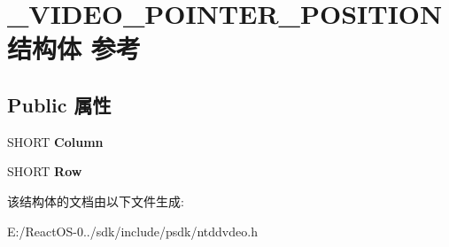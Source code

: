 \hypertarget{struct___v_i_d_e_o___p_o_i_n_t_e_r___p_o_s_i_t_i_o_n}{}\section{\+\_\+\+V\+I\+D\+E\+O\+\_\+\+P\+O\+I\+N\+T\+E\+R\+\_\+\+P\+O\+S\+I\+T\+I\+O\+N结构体 参考}
\label{struct___v_i_d_e_o___p_o_i_n_t_e_r___p_o_s_i_t_i_o_n}
\subsection*{Public 属性}
\begin{DoxyCompactItemize}
\item 
\mbox{\label{struct___v_i_d_e_o___p_o_i_n_t_e_r___p_o_s_i_t_i_o_n_a4c525ec035aa2a4da19f8be1cf081c00}} 
S\+H\+O\+RT {\bfseries Column}
\item 
\mbox{\label{struct___v_i_d_e_o___p_o_i_n_t_e_r___p_o_s_i_t_i_o_n_ab37bbe80cc878b3dfe3dff8e35cdf497}} 
S\+H\+O\+RT {\bfseries Row}
\end{DoxyCompactItemize}


该结构体的文档由以下文件生成\+:\begin{DoxyCompactItemize}
\item 
E\+:/\+React\+O\+S-\/0../sdk/include/psdk/ntddvdeo.\+h\end{DoxyCompactItemize}

